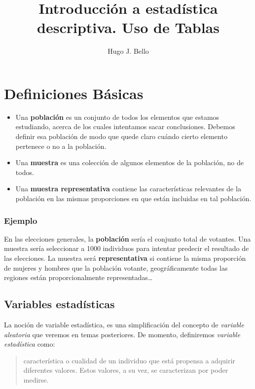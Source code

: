 \documentclass[
]{article}
\title{Introducción a estadística descriptiva. Uso de Tablas}
\author{Hugo J. Bello}
\date{}
\begin{document}
\maketitle

\hypertarget{definiciones-buxe1sicas}{%
\section{Definiciones Básicas}\label{definiciones-buxe1sicas}}

\begin{itemize}
\item
  Una \textbf{población} es un conjunto de todos los elementos que
  estamos estudiando, acerca de los cuales intentamos sacar
  conclusiones. Debemos definir esa población de modo que quede claro
  cuándo cierto elemento pertenece o no a la población.
\item
  Una \textbf{muestra} es una colección de algunos elementos de la
  población, no de todos.
\item
  Una \textbf{muestra representativa} contiene las características
  relevantes de la población en las mismas proporciones en que están
  incluidas en tal población.
\end{itemize}

\hypertarget{ejemplo}{%
\subsubsection{Ejemplo}\label{ejemplo}}

En las elecciones generales, la \textbf{población} sería el conjunto
total de votantes. Una muestra sería seleccionar a 1000 individuos para
intentar predecir el resultado de las elecciones. La muestra será
\textbf{representativa} si contiene la misma proporción de mujeres y
hombres que la población votante, geográficamente todas las regiones
están proporcionalmente representadas\ldots{}

\hypertarget{variables-estaduxedsticas}{%
\subsection{Variables estadísticas}\label{variables-estaduxedsticas}}

La noción de variable estadística, es una simplificación del concepto de
\emph{variable aleatoria} que veremos en temas posteriores. De momento,
definiremos \emph{variable estadística} como:

\begin{quote}
característica o cualidad de un individuo que está propensa a adquirir
diferentes valores. Estos valores, a su vez, se caracterizan por poder
medirse.
\end{quote}
\end{document}
